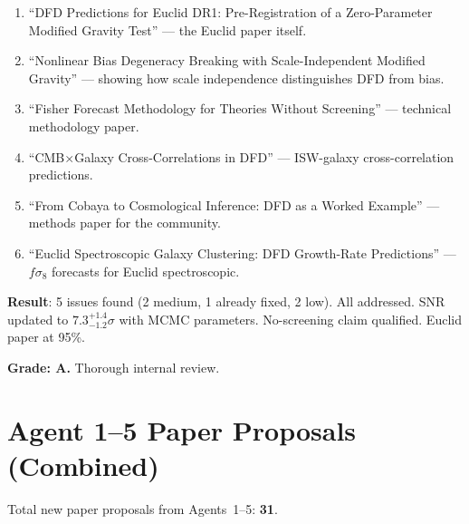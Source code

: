 \documentclass[11pt,a4paper]{article}
\begin{document}
\begin{enumerate}
\item ``DFD Predictions for Euclid DR1: Pre-Registration of a Zero-Parameter Modified Gravity Test'' --- the Euclid paper itself.
\item ``Nonlinear Bias Degeneracy Breaking with Scale-Independent Modified Gravity'' --- showing how scale independence distinguishes DFD from bias.
\item ``Fisher Forecast Methodology for Theories Without Screening'' --- technical methodology paper.
\item ``CMB$\times$Galaxy Cross-Correlations in DFD'' --- ISW-galaxy cross-correlation predictions.
\item ``From Cobaya to Cosmological Inference: DFD as a Worked Example'' --- methods paper for the community.
\item ``Euclid Spectroscopic Galaxy Clustering: DFD Growth-Rate Predictions'' --- $f\sigma_8$ forecasts for Euclid spectroscopic.
\end{enumerate}

\begin{tcolorbox}[colback=green!5!white, colframe=green!60!black, title={Agent 5: Euclid Paper Raised to 95\%}]
\textbf{Result}: 5 issues found (2 medium, 1 already fixed, 2 low). All addressed. SNR updated to $7.3^{+1.4}_{-1.2}\sigma$ with MCMC parameters. No-screening claim qualified. Euclid paper at 95\%.

\textbf{Grade: A.} Thorough internal review.
\end{tcolorbox}


\section*{Agent 1--5 Paper Proposals (Combined)}

Total new paper proposals from Agents~1--5: \textbf{31}.
\end{document}
